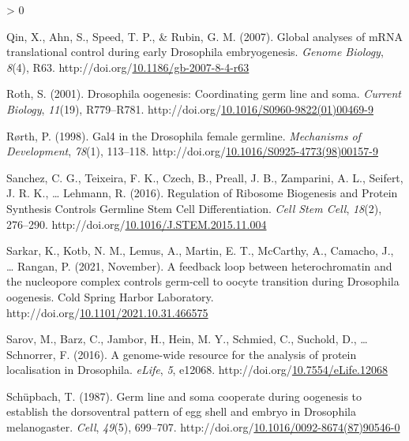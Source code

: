 \documentclass[12pt,oneside]{reedthesis}
\newlength{\cslhangindent}
\newenvironment{CSLReferences}[2] %
 {%
  \setlength{\parindent}{0pt}
  \ifodd #1 \everypar{\setlength{\hangindent}{\cslhangindent}}\ignorespaces\fi
  \ifnum #2 > 0
  \setlength{\parskip}{#2\baselineskip}
  \fi
 }%
 {}
\begin{document}
\begin{CSLReferences}{1}{0}
\leavevmode\hypertarget{ref-qinGlobalAnalysesMRNA2007a}{}%
Qin, X., Ahn, S., Speed, T. P., \& Rubin, G. M. (2007). Global analyses of {mRNA} translational control during early {Drosophila} embryogenesis. \emph{Genome Biology}, \emph{8}(4), R63. http://doi.org/\href{https://doi.org/10.1186/gb-2007-8-4-r63}{10.1186/gb-2007-8-4-r63}

\leavevmode\hypertarget{ref-rothDrosophilaOogenesisCoordinating2001}{}%
Roth, S. (2001). Drosophila oogenesis: {Coordinating} germ line and soma. \emph{Current Biology}, \emph{11}(19), R779--R781. http://doi.org/\href{https://doi.org/10.1016/S0960-9822(01)00469-9}{10.1016/S0960-9822(01)00469-9}

\leavevmode\hypertarget{ref-rorthGal4DrosophilaFemale1998}{}%
Rørth, P. (1998). Gal4 in the {Drosophila} female germline. \emph{Mechanisms of Development}, \emph{78}(1), 113--118. http://doi.org/\href{https://doi.org/10.1016/S0925-4773(98)00157-9}{10.1016/S0925-4773(98)00157-9}

\leavevmode\hypertarget{ref-Sanchez2016h}{}%
Sanchez, C. G., Teixeira, F. K., Czech, B., Preall, J. B., Zamparini, A. L., Seifert, J. R. K., \ldots{} Lehmann, R. (2016). Regulation of {Ribosome Biogenesis} and {Protein Synthesis Controls Germline Stem Cell Differentiation}. \emph{Cell Stem Cell}, \emph{18}(2), 276--290. http://doi.org/\href{https://doi.org/10.1016/J.STEM.2015.11.004}{10.1016/J.STEM.2015.11.004}

\leavevmode\hypertarget{ref-sarkarFeedbackLoopHeterochromatin2021}{}%
Sarkar, K., Kotb, N. M., Lemus, A., Martin, E. T., McCarthy, A., Camacho, J., \ldots{} Rangan, P. (2021, November). A feedback loop between heterochromatin and the nucleopore complex controls germ-cell to oocyte transition during {Drosophila} oogenesis. {Cold Spring Harbor Laboratory}. http://doi.org/\href{https://doi.org/10.1101/2021.10.31.466575}{10.1101/2021.10.31.466575}

\leavevmode\hypertarget{ref-sarovGenomewideResourceAnalysis2016}{}%
Sarov, M., Barz, C., Jambor, H., Hein, M. Y., Schmied, C., Suchold, D., \ldots{} Schnorrer, F. (2016). A genome-wide resource for the analysis of protein localisation in {Drosophila}. \emph{eLife}, \emph{5}, e12068. http://doi.org/\href{https://doi.org/10.7554/eLife.12068}{10.7554/eLife.12068}

\leavevmode\hypertarget{ref-schupbachGermLineSoma1987}{}%
Schüpbach, T. (1987). Germ line and soma cooperate during oogenesis to establish the dorsoventral pattern of egg shell and embryo in {Drosophila} melanogaster. \emph{Cell}, \emph{49}(5), 699--707. http://doi.org/\href{https://doi.org/10.1016/0092-8674(87)90546-0}{10.1016/0092-8674(87)90546-0}


\end{CSLReferences}
\end{document}
